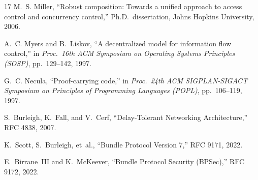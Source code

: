 \documentclass[11pt,letterpaper]{article}
\theoremstyle{occplain}
\theoremstyle{occremark}
\begin{document}
\begin{thebibliography}{17}
M.~S. Miller,
``Robust composition: Towards a unified approach to access control and concurrency control,''
Ph.D.\ dissertation, Johns Hopkins University, 2006.

A.~C. Myers and B.~Liskov,
``A decentralized model for information flow control,''
in \emph{Proc.\ 16th ACM Symposium on Operating Systems Principles (SOSP)}, pp.~129--142, 1997.

G.~C. Necula,
``Proof-carrying code,''
in \emph{Proc.\ 24th ACM SIGPLAN-SIGACT Symposium on Principles of Programming Languages (POPL)}, pp.~106--119, 1997.

S.~Burleigh, K.~Fall, and V.~Cerf,
``Delay-Tolerant Networking Architecture,''
RFC 4838, 2007.

K.~Scott, S.~Burleigh, et~al.,
``Bundle Protocol Version 7,''
RFC 9171, 2022.

E.~Birrane~III and K.~McKeever,
``Bundle Protocol Security (BPSec),''
RFC 9172, 2022.

\end{thebibliography}
\end{document}
